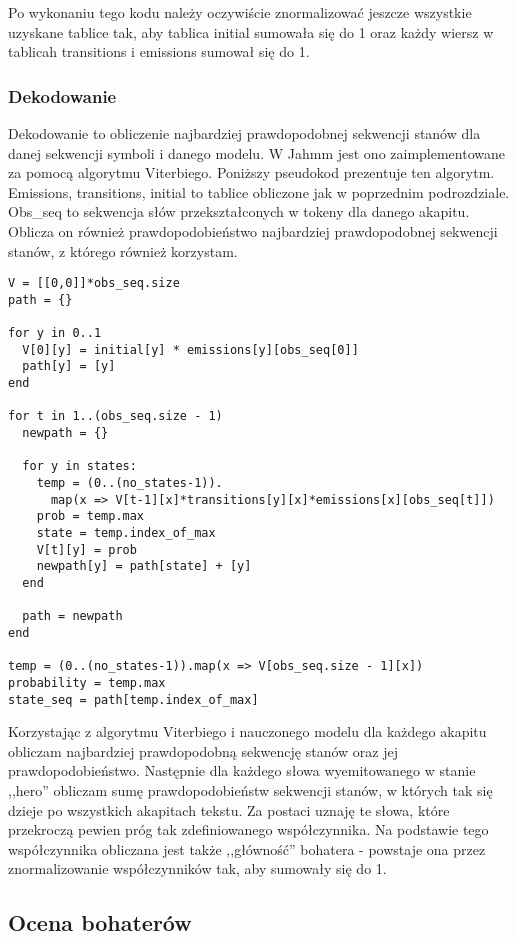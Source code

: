 \documentclass[10pt,a4paper]{article}
\begin{document}
				Po wykonaniu tego kodu należy oczywiście znormalizować jeszcze wszystkie uzyskane tablice tak, aby tablica initial sumowała się do 1 oraz każdy wiersz w tablicah transitions i emissions sumował się do 1.

		\subsubsection{Dekodowanie}

			Dekodowanie to obliczenie najbardziej prawdopodobnej sekwencji stanów dla danej sekwencji symboli i danego modelu. W Jahmm jest ono zaimplementowane za pomocą algorytmu Viterbiego. Poniższy pseudokod prezentuje ten algorytm. Emissions, transitions, initial to tablice obliczone jak w poprzednim podrozdziale. Obs\_seq to sekwencja słów przekształconych w tokeny dla danego akapitu. Oblicza on również prawdopodobieństwo najbardziej prawdopodobnej sekwencji stanów, z którego również korzystam.

\begin{verbatim}
V = [[0,0]]*obs_seq.size
path = {}
 
for y in 0..1
  V[0][y] = initial[y] * emissions[y][obs_seq[0]]
  path[y] = [y]
end
 
for t in 1..(obs_seq.size - 1)
  newpath = {}
 
  for y in states:
    temp = (0..(no_states-1)).
      map(x => V[t-1][x]*transitions[y][x]*emissions[x][obs_seq[t]])
    prob = temp.max
    state = temp.index_of_max
    V[t][y] = prob
    newpath[y] = path[state] + [y]
  end
 
  path = newpath
end

temp = (0..(no_states-1)).map(x => V[obs_seq.size - 1][x])
probability = temp.max
state_seq = path[temp.index_of_max]
\end{verbatim}

			Korzystając z algorytmu Viterbiego i nauczonego modelu dla każdego akapitu obliczam najbardziej prawdopodobną sekwencję stanów oraz jej prawdopodobieństwo. Następnie dla każdego słowa wyemitowanego w stanie ,,hero'' obliczam sumę prawdopodobieństw sekwencji stanów, w których tak się dzieje po wszystkich akapitach tekstu. Za postaci uznaję te słowa, które przekroczą pewien próg tak zdefiniowanego współczynnika. Na podstawie tego współczynnika obliczana jest także ,,główność'' bohatera - powstaje ona przez znormalizowanie współczynników tak, aby sumowały się do 1.

	\subsection{Ocena bohaterów}
\end{document}
